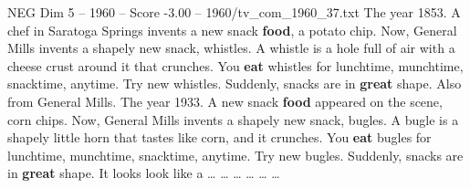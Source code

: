 \begin{textsample}{NEG Dim 5 – 1960 – Score -3.00 – 1960/tv\_com\_1960\_37.txt}  \label{ex:f5_neg_006}
The year 1853.
A chef in Saratoga Springs invents a new snack \textbf{food}, a potato chip.
Now, General Mills invents a shapely new snack, whistles.
A whistle is a hole full of air with a cheese crust around it that crunches.
You \textbf{eat} whistles for lunchtime, munchtime, snacktime, anytime.
Try new whistles.
Suddenly, snacks are in \textbf{great} shape.
Also from General Mills.
The year 1933.
A new snack \textbf{food} appeared on the scene, corn chips.
Now, General Mills invents a shapely new snack, bugles.
A bugle is a shapely little horn that tastes like corn, and it crunches.
You \textbf{eat} bugles for lunchtime, munchtime, snacktime, anytime.
Try new bugles.
Suddenly, snacks are in \textbf{great} shape.
It looks look like a … … … … … …

\end{textsample}
